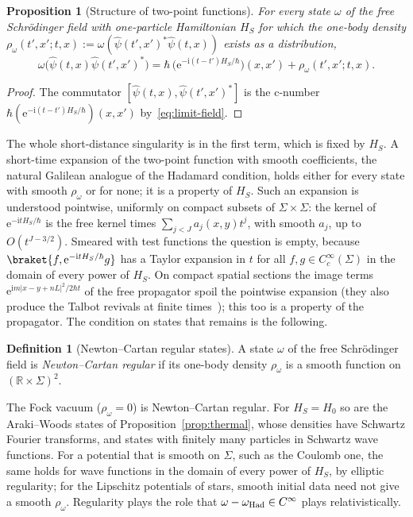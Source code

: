 \documentclass[%
 aip,
 jmp,
 amsmath,amssymb,
 reprint, onecolumn
]{revtex4-1}
\newtheorem{proposition}{Proposition}
\theoremstyle{definition}
\newtheorem{definition}{Definition}
\theoremstyle{remark}
\newcommand{\R}{\mathbb{R}}
\newcommand{\rmi}{\mathrm{i}}
\newcommand{\rme}{\mathrm{e}}
\begin{document}
\begin{proposition}[Structure of two-point functions]\label{prop:structure}
For every state $\omega$ of the free Schr\"odinger field with
one-particle Hamiltonian $H_S$ for which the one-body density
$\rho_\omega(t',x';t,x):=\omega(\hat\psi(t',x')^*\hat\psi(t,x))$ exists
as a distribution,
\begin{equation}\label{eq:NR-two-point}
\omega\bigl(\hat\psi(t,x)\hat\psi(t',x')^*\bigr)=\hbar\,
\bigl(\rme^{-\rmi(t-t')H_S/\hbar}\bigr)(x,x')+\rho_\omega(t',x';t,x).
\end{equation}
\end{proposition}

\begin{proof}
The commutator $[\hat\psi(t,x),\hat\psi(t',x')^*]$ is the c-number
$\hbar(\rme^{-\rmi(t-t')H_S/\hbar})(x,x')$ by~\eqref{eq:limit-field}.
\end{proof}

The whole short-distance singularity is in the first term, which is
fixed by $H_S$. A short-time expansion of the two-point function with
smooth coefficients, the natural Galilean analogue of the Hadamard
condition, holds either for every state with smooth $\rho_\omega$ or for
none; it is a property of $H_S$. Such an expansion is understood
pointwise, uniformly on compact subsets of $\Sigma\times\Sigma$: the
kernel of $\rme^{-\rmi tH_S/\hbar}$ is the free kernel times
$\sum_{j<J}a_j(x,y)t^j$, with smooth $a_j$, up to $O(t^{J-3/2})$. Smeared
with test functions the question is empty, because $\braket{f,
\rme^{-\rmi tH_S/\hbar}g}$ has a Taylor expansion in $t$ for all $f,g\in
C_c^\infty(\Sigma)$ in the domain of every power of $H_S$. On compact
spatial sections the image terms $\rme^{\rmi m|x-y+nL|^2/2\hbar t}$ of
the free propagator spoil the pointwise expansion (they also produce the
Talbot revivals at finite times~\cite{BerryKlein1996}); this too is a
property of the propagator. The condition on states that remains is the
following.

\begin{definition}[Newton--Cartan regular states]
\label{def:NC-regular}
A state $\omega$ of the free Schr\"odinger field is \emph{Newton--Cartan
regular} if its one-body density $\rho_\omega$ is a smooth function on
$(\R\times\Sigma)^2$.
\end{definition}

The Fock vacuum ($\rho_\omega=0$) is Newton--Cartan regular. For
$H_S=H_0$ so are the Araki--Woods states of
Proposition~\ref{prop:thermal}, whose densities have Schwartz Fourier
transforms, and states with finitely many particles in Schwartz wave
functions. For a potential that is smooth on $\Sigma$, such as the
Coulomb one, the same holds for wave functions in the domain of every
power of $H_S$, by elliptic regularity; for the Lipschitz potentials of
stars, smooth initial data need not give a smooth $\rho_\omega$. Regularity plays the
role that $\omega-\omega_{\rm Had}\in C^\infty$ plays relativistically.
\end{document}
